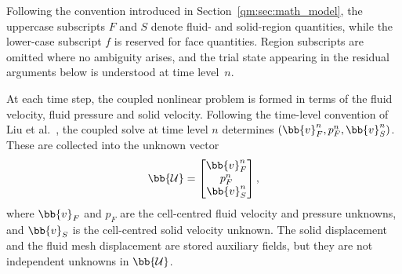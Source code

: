 Following the convention introduced in Section~\ref{qm:sec:math_model}, the uppercase subscripts $F$ and $S$ denote fluid- and solid-region quantities, while the lower-case subscript $f$ is reserved for face quantities. Region subscripts are omitted where no ambiguity arises, and the trial state appearing in the residual arguments below is understood at time level~$n$.

At each time step, the coupled nonlinear problem is formed in terms of the
fluid velocity, fluid pressure and solid velocity.
Following the time-level convention of Liu et al.~\citep{Liu2014}, the coupled solve at time level $n$ determines $(\bb{v}_F^n,p_F^n,\bb{v}_S^n)$.
These are collected into the unknown vector
\begin{equation}
    \bb{\mathcal{U}}
    =
    \begin{bmatrix}
    \bb{v}_F^n \\
    p_F^n \\
    \bb{v}_S^n
    \end{bmatrix},
    \label{qm:eqn:coupled_unknown_vector}
\end{equation}
where $\bb{v}_F$ and $p_F$ are the cell-centred fluid velocity and pressure
unknowns, and $\bb{v}_S$ is the cell-centred solid velocity unknown. The solid
displacement and the fluid mesh displacement are stored auxiliary fields, but
they are not independent unknowns in $\bb{\mathcal{U}}$.


